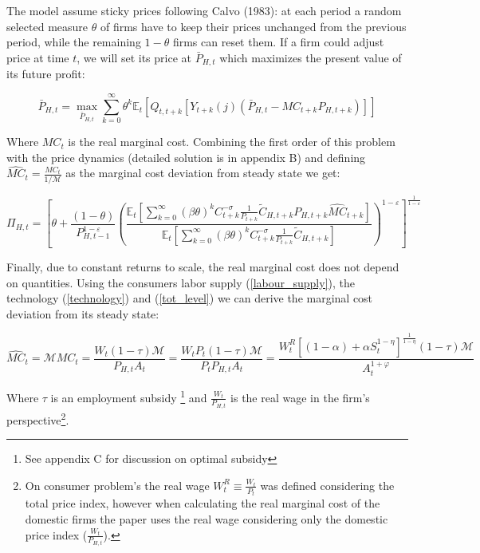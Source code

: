 \documentclass{article}
\newcommand{\Et}{\mathbb{E}_t}
\begin{document}
The model assume sticky prices following Calvo (1983): at each period a random selected measure $\theta$ of firms have to keep their prices unchanged from the previous period, while the remaining $1-\theta$ firms can reset them. If a firm could adjust price at time $t$, we will set its price at $\bar P_{H,t}$ which maximizes the present value of its future profit:

\begin{equation}
    \bar P_{H,t} = \max_{\bar P_{H,t}} \sum^\infty_{k=0} \theta^k \Et \left[ Q_{t, t+k}[Y_{t+k}(j) (\bar P_{H,t} - MC_{t+k} P_{H,t+k})] \right]
\end{equation}

Where $MC_t$ is the real marginal cost. Combining the first order of this problem with the price dynamics (detailed solution is in appendix B) and defining $\widehat{MC}_t = \frac{MC_t}{1/ \mathcal M}$ as the marginal cost deviation from steady state we get:

\begin{equation}
    \label{nkpc}
    \Pi_{H,t} = \left[ \theta + \frac{(1-\theta)}{P_{H,t-1}^{1-\varepsilon}} \left(\frac{\Et\left[ \sum^\infty_{k=0} (\beta\theta)^k C_{t+k}^{-\sigma} \frac{1}{P_{t+k}}\tilde C_{H,t+k} P_{H,t+k} \widehat{MC}_{t+k}\right] }{\Et\left[ \sum^\infty_{k=0} (\beta\theta)^k C_{t+k}^{-\sigma} \frac{1}{P_{t+k}} \tilde C_{H,t+k}  \right]} \right)^{1-\varepsilon}\right]^\frac{1}{1-\varepsilon}
\end{equation}

Finally, due to constant returns to scale, the real marginal cost does not depend on quantities. Using the consumers labor supply (\ref{labour_supply}), the technology (\ref{technology}) and (\ref{tot_level}) we can derive the marginal cost deviation from its steady state:

\begin{equation}
    \label{marginal_cost}
    \widehat{MC}_t = \mathcal M MC_t = \frac{W_t (1 - \tau) \mathcal M}{P_{H,t}A_t} = \frac{W_t P_t (1 - \tau)\mathcal M}{P_t P_{H,t}A_t}
    = \frac{W_t^R \left[(1-\alpha) + \alpha S_t^{1-\eta} \right]^{\frac{1}{1-\eta}} (1 - \tau) \mathcal M}{A_t^{1+\varphi}}
\end{equation}

Where $\tau$ is an employment subsidy \footnote{See appendix C for discussion on optimal subsidy} and $\frac{W_t}{P_{H,t}}$ is the real wage in the firm's perspective\footnote{On consumer problem's the real wage $W_t^R \equiv \frac{W_t}{P_t}$ was defined considering the total price index, however when calculating the real marginal cost of the domestic firms the paper uses the real wage considering only the domestic price index ($\frac{W_t}{P_{H,t}}$).}.\\
\end{document}
